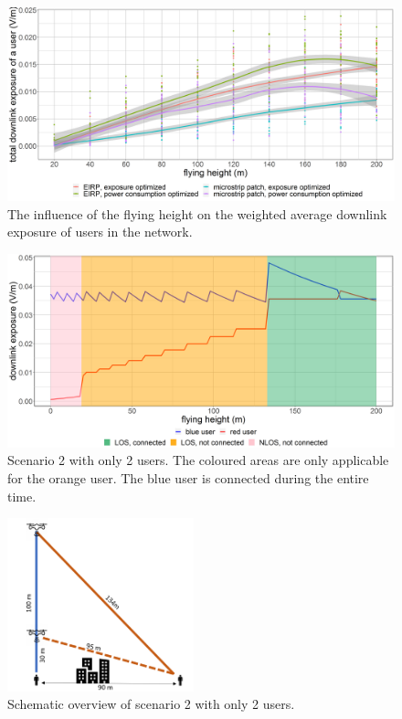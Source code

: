 \begin{figure}[h!]
  \includegraphics[width=\textwidth]{../results/s2/fhvsdl.png}
  \caption{The influence of the flying height on the weighted average downlink exposure of users in the network.}
  \label{fig:s2fhvsdl}
\end{figure}

\begin{figure}[bh!]
  \includegraphics[width=\textwidth]{../results/s2/prove.png}
  \caption{Scenario 2 with only 2 users. The coloured areas are only applicable for the orange user. The blue user is connected during the entire time.}
  \label{fig:prove}
\end{figure}


\begin{figure}
  \begin{center}
    \includegraphics[width=0.48\textwidth]{../results/s2/proveScenario.png}
  \end{center}
  \caption{Schematic overview of scenario 2 with only 2 users.}
  \label{fig:schematicprove}
\end{figure}

